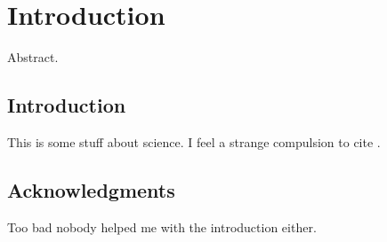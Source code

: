 \chapter{Introduction}
\label{c.intro}

Abstract.

\section{Introduction}

This is some stuff about science. I feel a strange compulsion to cite
\citet{williams12}.

\section*{Acknowledgments}

Too bad nobody helped me with the introduction either.
